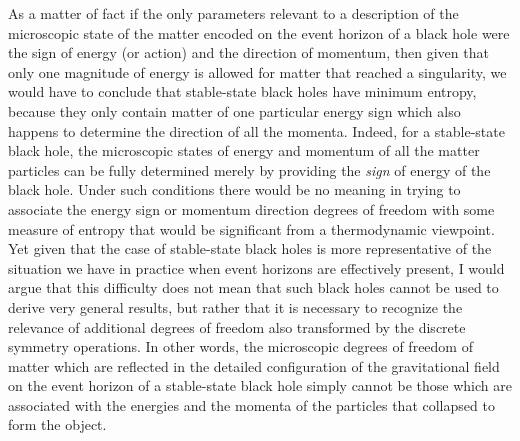 \documentclass[notitlepage,12pt]{report}
\begin{document}
As a matter of fact if the only parameters relevant to a description of the microscopic state of the matter encoded on the event horizon of a black hole were the sign of energy (or action) and the direction of momentum, then given that only one magnitude of energy is allowed for matter that reached a singularity, we would have to conclude that stable-state black holes have minimum entropy, because they only contain matter of one particular energy sign which also happens to determine the direction of all the momenta. Indeed, for a stable-state black hole, the microscopic states of energy and momentum of all the matter particles can be fully determined merely by providing the \textit{sign} of energy of the black hole. Under such conditions there would be no meaning in trying to associate the energy sign or momentum direction degrees of freedom with some measure of entropy that would be significant from a thermodynamic viewpoint. Yet given that the case of stable-state black holes is more representative of the situation we have in practice when event horizons are effectively present, I would argue that this difficulty does not mean that such black holes cannot be used to derive very general results, but rather that it is necessary to recognize the relevance of additional degrees of freedom also transformed by the discrete symmetry operations. In other words, the microscopic degrees of freedom of matter which are reflected in the detailed configuration of the gravitational field on the event horizon of a stable-state black hole simply cannot be those which are associated with the energies and the momenta of the particles that collapsed to form the object.
\end{document}
